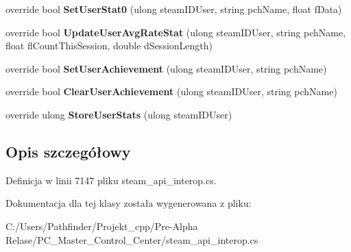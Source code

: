 \begin{DoxyCompactItemize}
\item 
\mbox{\label{class_valve_1_1_steamworks_1_1_c_steam_game_server_stats_a2ff9f3e279565f12ce2e4c6447312eef}} 
override bool {\bfseries Set\+User\+Stat0} (ulong steam\+I\+D\+User, string pch\+Name, float f\+Data)
\item 
\mbox{\label{class_valve_1_1_steamworks_1_1_c_steam_game_server_stats_a7c529ad04876756eaf083b48ccefba78}} 
override bool {\bfseries Update\+User\+Avg\+Rate\+Stat} (ulong steam\+I\+D\+User, string pch\+Name, float fl\+Count\+This\+Session, double d\+Session\+Length)
\item 
\mbox{\label{class_valve_1_1_steamworks_1_1_c_steam_game_server_stats_a2cb4e77d33c088b36a959bd802ca2dcc}} 
override bool {\bfseries Set\+User\+Achievement} (ulong steam\+I\+D\+User, string pch\+Name)
\item 
\mbox{\label{class_valve_1_1_steamworks_1_1_c_steam_game_server_stats_aa1663288da146adc34a38d519b960388}} 
override bool {\bfseries Clear\+User\+Achievement} (ulong steam\+I\+D\+User, string pch\+Name)
\item 
\mbox{\label{class_valve_1_1_steamworks_1_1_c_steam_game_server_stats_a24593ea5c95d9cbbfc408c6f4b46fc04}} 
override ulong {\bfseries Store\+User\+Stats} (ulong steam\+I\+D\+User)
\end{DoxyCompactItemize}


\subsection{Opis szczegółowy}


Definicja w linii 7147 pliku steam\+\_\+api\+\_\+interop.\+cs.



Dokumentacja dla tej klasy została wygenerowana z pliku\+:\begin{DoxyCompactItemize}
\item 
C\+:/\+Users/\+Pathfinder/\+Projekt\+\_\+cpp/\+Pre-\/\+Alpha Relase/\+P\+C\+\_\+\+Master\+\_\+\+Control\+\_\+\+Center/steam\+\_\+api\+\_\+interop.\+cs\end{DoxyCompactItemize}
